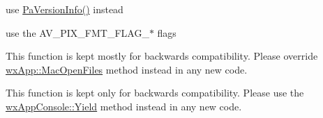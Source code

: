 \begin{DoxyRefList}
\item[\label{deprecated__deprecated000036}%
\hypertarget{deprecated__deprecated000036}{}%
Member \hyperlink{pa__front_8c_a28f3fd9e6d9f933cc695abea71c4b445}{Pa\+\_\+\+Get\+Version\+Text} (void)]use \hyperlink{portaudio_8h_afe94d0dac83fa52b7ae7aaec5b34654f}{Pa\+Version\+Info()} instead  
\item[\label{deprecated__deprecated000029}%
\hypertarget{deprecated__deprecated000029}{}%
Member \hyperlink{pixdesc_8h_a70c18ff2ad9096cb1e38cfd1ed2f3530}{P\+I\+X\+\_\+\+F\+M\+T\+\_\+\+BE} ]use the A\+V\+\_\+\+P\+I\+X\+\_\+\+F\+M\+T\+\_\+\+F\+L\+A\+G\+\_\+$\ast$ flags  
\item[\label{deprecated__deprecated000038}%
\hypertarget{deprecated__deprecated000038}{}%
Member \hyperlink{classwx_app_a420a1cef557cfe2edaee6ffdaaa5f7fb}{wx\+App\+:\+:Mac\+Open\+File} (const wx\+String \&file\+Name)]This function is kept mostly for backwards compatibility. Please override \hyperlink{classwx_app_a0cf8d83fc9e1a7b7f911f29f05127d24}{wx\+App\+::\+Mac\+Open\+Files} method instead in any new code. 
\item[\label{deprecated__deprecated000037}%
\hypertarget{deprecated__deprecated000037}{}%
Member \hyperlink{group__group__funcmacro__appinitterm_gac386c89a04e364afc07edce6d848c27a}{wx\+Yield} ()]This function is kept only for backwards compatibility. Please use the \hyperlink{classwx_app_console_a302adeb701f247bf8cac1570efc25020}{wx\+App\+Console\+::\+Yield} method instead in any new code.
\end{DoxyRefList}